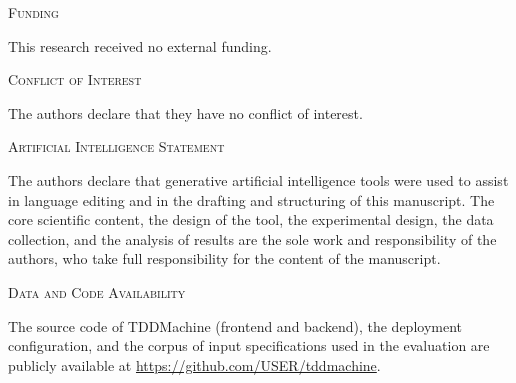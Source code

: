 \documentclass[10pt,journal,twoside,letterpaper]{IEEEtran}
\newcommand{\repourl}{https://github.com/USER/tddmachine}  %
\newcommand{\seccionfunding}[1]{%
    \vspace{0.6em}
    \noindent\textsc{Funding}
    \par\vspace{0.2em}
    \small #1
    \par
}
\newcommand{\seccionconflicto}[1]{%
    \vspace{0.6em}
    \noindent\textsc{Conflict of Interest}
    \par\vspace{0.2em}
    \small #1
    \par
}
\newcommand{\seccioniadeclaracion}[1]{%
    \vspace{0.6em}
    \noindent\textsc{Artificial Intelligence Statement}
    \par\vspace{0.2em}
    \small #1
    \par
}
\newcommand{\secciondatos}[1]{%
    \vspace{0.6em}
    \noindent\textsc{Data and Code Availability}
    \par\vspace{0.2em}
    \small #1
    \par
}
\begin{document}
    \seccionfunding{%
        This research received no external funding.
    }
    
    \seccionconflicto{%
        The authors declare that they have no conflict of interest.
    }
    
    \seccioniadeclaracion{%
        The authors declare that generative artificial intelligence tools were used to assist in language editing and in the drafting and structuring of this manuscript. The core scientific content, the design of the tool, the experimental design, the data collection, and the analysis of results are the sole work and responsibility of the authors, who take full responsibility for the content of the manuscript.
    }
    
    \secciondatos{%
        The source code of TDDMachine (frontend and backend), the deployment configuration, and the corpus of input specifications used in the evaluation are publicly available at \url{\repourl}.
    }
    
    
    
    
\end{document}

